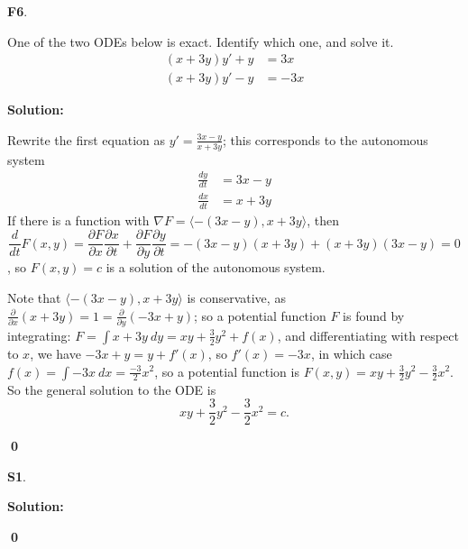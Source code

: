 \documentclass{article}
\newenvironment{problem}[1]
{
  \begin{flushleft}
  \textbf{#1}.
  \ignorespaces
}
{
  \end{flushleft}
}
\newenvironment{solution}
{
  \ignorespaces
  \textbf{Solution:}
}
{
  \ignorespacesafterend
  \begin{flushright}
  {\bfseries \qed}
  \end{flushright}
}
\begin{document}
\begin{problem}{F6}
One of the two ODEs below is exact.  Identify which one, and solve it.
\begin{align*}
 (x + 3y)y'+y &=3x \\ %
 (x + 3y)y'-y &=-3x  
\end{align*}
\end{problem}
\begin{solution}
Rewrite the first equation as \(y'=\frac{3x-y}{x+3y}\); this corresponds to the autonomous system 
\begin{align*}
\frac{dy}{dt} &= 3x - y \\
\frac{dx}{dt} &= x + 3y 
\end{align*}
If there is a function with \(\nabla F = \langle -(3x-y), x+3y\rangle\), then \[\frac{d}{dt}F(x,y)=\frac{\partial F}{\partial x} \frac{\partial x}{\partial t} + \frac{\partial F}{\partial y} \frac{\partial y}{\partial t} = -(3x-y)(x+3y)+(x+3y)(3x-y)=0\], so \(F(x,y)=c\) is a solution of the autonomous system.

Note that  \(\langle -(3x-y), x+3y\rangle\) is conservative, as \(\frac{\partial}{\partial x}(x+3y)=1=\frac{\partial}{\partial y}(-3x+y)\); so a potential function \(F\) is found by integrating: \(F = \int x+3y\ dy = xy+\frac{3}{2}y^2+f(x) \), and differentiating with respect to \(x\), we have \(-3x+y=y+f'(x)\), so \(f'(x)=-3x\), in which case \(f(x)=\int -3x\ dx = \frac{-3}{2}x^2\), so a potential function is \(F(x,y)=xy+\frac{3}{2}y^2-\frac{3}{2}x^2\).  So the general solution to the ODE is
\[ xy+\frac{3}{2}y^2-\frac{3}{2}x^2 = c.\]
\end{solution}


\begin{problem}{S1}

\end{problem}
\begin{solution}

\end{solution}
\end{document}
